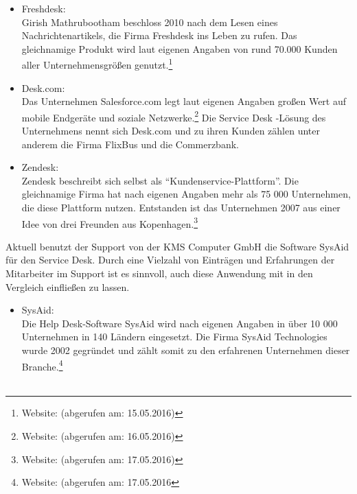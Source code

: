 \begin{itemize}
\item Freshdesk:\\
		Girish Mathrubootham beschloss 2010 nach dem Lesen eines Nachrichtenartikels, die Firma 
		Freshdesk ins Leben zu rufen. Das gleichnamige Produkt wird laut eigenen Angaben von rund 
		70.000 Kunden aller Unternehmensgrößen genutzt.\footnote{Website: \citeauthor{Freshdesk} (abgerufen am: 15.05.2016)}
		\\
		 
\item Desk.com:\\
		Das Unternehmen Salesforce.com legt laut eigenen Angaben großen Wert auf mobile 
		Endgeräte und soziale Netzwerke.\footnote{Website: \citeauthor{Salesforce} (abgerufen am: 16.05.2016)} Die Service Desk -Lösung 
		des Unternehmens nennt sich Desk.com und zu ihren Kunden zählen unter anderem die Firma 
		FlixBus und die Commerzbank.
		\\
		
\item Zendesk:\\
		Zendesk beschreibt sich selbst als \enquote{Kundenservice-Plattform}. Die gleichnamige 
		Firma hat nach eigenen Angaben mehr als 75 000 Unternehmen, die diese Plattform nutzen. 
		Entstanden ist das Unternehmen 2007 aus einer Idee von drei Freunden aus Kopenhagen.\footnote{Website: \citeauthor{Zendesk} (abgerufen am: 17.05.2016)}
		\\		
\end{itemize}

\noindent
Aktuell benutzt der Support von der KMS Computer GmbH die Software SysAid für den Service Desk. Durch eine Vielzahl von Einträgen und Erfahrungen der Mitarbeiter im Support ist es sinnvoll, auch diese Anwendung mit in den Vergleich einfließen zu lassen.

\begin{itemize}
\item SysAid:\\
		 Die Help Desk-Software SysAid wird nach eigenen Angaben in über 10 000 Unternehmen in 
		 140 Ländern eingesetzt. Die Firma SysAid Technologies wurde 2002 gegründet und zählt somit 
		 zu den erfahrenen Unternehmen dieser Branche.\footnote{Website: \citeauthor{SysAid} (abgerufen am: 17.05.2016}
		\\\\
\end{itemize}	


